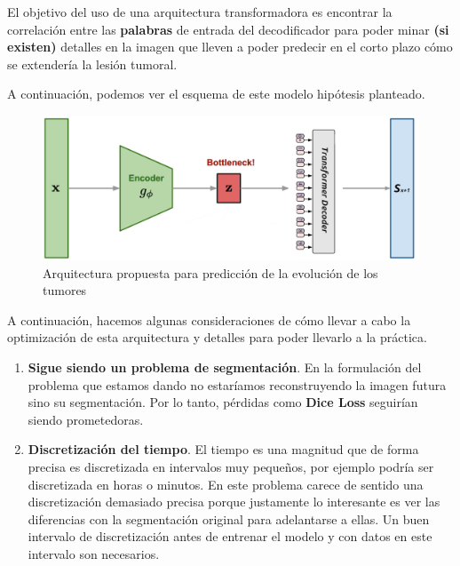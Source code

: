 El objetivo del uso de una arquitectura transformadora es encontrar la correlación entre las \textbf{palabras} de entrada del decodificador para poder minar \textbf{(si existen)} detalles en la imagen que lleven a poder predecir en el corto plazo cómo se extendería la lesión tumoral.

A continuación, podemos ver el esquema de este modelo hipótesis planteado.

\begin{figure}[H]
	\centering
	\includegraphics[width=0.9\linewidth]{imagenes/esquema_evolucion.png}
	\caption{Arquitectura propuesta para predicción de la evolución de los tumores}
\end{figure}

A continuación, hacemos algunas consideraciones de cómo llevar a cabo la optimización de esta arquitectura y detalles para poder llevarlo a la práctica.

\begin{enumerate}
	\item \textbf{Sigue siendo un problema de segmentación}. En la formulación del problema que estamos dando no estaríamos reconstruyendo la imagen futura sino su segmentación. Por lo tanto, pérdidas como \textbf{Dice Loss} seguirían siendo prometedoras.
	\item \textbf{Discretización del tiempo}. El tiempo es una magnitud que de forma precisa es discretizada en intervalos muy pequeños, por ejemplo podría ser discretizada en horas o minutos. En este problema carece de sentido una discretización demasiado precisa porque justamente lo interesante es ver las diferencias con la segmentación original para adelantarse a ellas. Un buen intervalo de discretización antes de entrenar el modelo y con datos en este intervalo son necesarios.
\end{enumerate}
